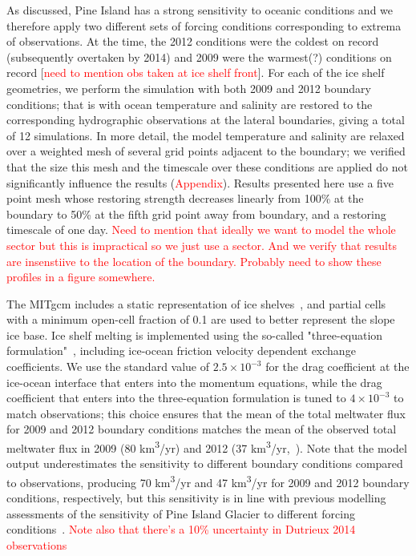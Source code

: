 \documentclass[draft]{agujournal2019}
\newcommand{\red}[1]{\textcolor{red}{#1}}
\begin{document}
As discussed, Pine Island has a strong sensitivity to oceanic conditions and we therefore apply two different sets of forcing conditions corresponding to extrema of observations. At the time, the 2012 conditions were the coldest on record (subsequently overtaken by 2014) and 2009 were the warmest(?) conditions on record [\red{need to mention obs taken at ice shelf front}]. For each of the ice shelf geometries, we perform the simulation with both 2009 and 2012 boundary conditions; that is with ocean temperature and salinity are restored to the corresponding hydrographic observations at the lateral boundaries, giving a total of 12 simulations. In more detail, the model temperature and salinity are relaxed over a weighted mesh of several grid points adjacent to the boundary; we verified that the size this mesh and the timescale over these conditions are applied do not significantly influence the results (\red{Appendix}). Results presented here use a five point mesh whose restoring strength decreases linearly from 100\% at the boundary to 50\% at the fifth grid point away from boundary, and a restoring timescale of one day. \red{Need to mention that ideally we want to model the whole sector but this is impractical so we just use a sector. And we verify that results are insenstiive to the location of the boundary. Probably need to show these profiles in a figure somewhere.}


The MITgcm includes a static representation of ice shelves~\cite{Losch2008JGeophysResOceans}, and partial cells with a minimum open-cell fraction of 0.1 are used to better represent the slope ice base. Ice shelf melting is implemented using the so-called "three-equation formulation"~\cite{Holland1999JPhysOcean}, including ice-ocean friction velocity dependent exchange coefficients. We use the standard value of $2.5\times10^{-3}$ for the drag coefficient at the ice-ocean interface that enters into the momentum equations, while the drag coefficient that enters into the three-equation formulation is tuned to $4\times10^{-3}$ to match observations; this choice ensures that the mean of the total meltwater flux for 2009 and 2012 boundary conditions matches the mean of the observed total meltwater flux in 2009 (80 km\textsuperscript{3}/yr) and 2012 (37 km\textsuperscript{3}/yr,~\cite{Dutrieux2014Science}). Note that the model output underestimates the sensitivity to different boundary conditions compared to observations, producing 70 km\textsuperscript{3}/yr and 47 km\textsuperscript{3}/yr for 2009 and 2012 boundary conditions, respectively, but this sensitivity is in line with previous modelling assessments of the sensitivity of Pine Island Glacier to different forcing conditions~\cite{Dutrieux2014Science, DeRydt2014JGeophysResOceans}. \red{Note also that there's a 10\% uncertainty in Dutrieux 2014 observations}
\end{document}
